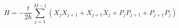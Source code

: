 \documentclass{article}
\begin{document}
\[H = -\frac{t}{2\hbar} \sum\limits_{j=1}^{M-1} ( X_jX_{j+1} + X_{j+1}X_j + P_jP_{j+1} + P_{j+1}P_j )
\]
\end{document}
